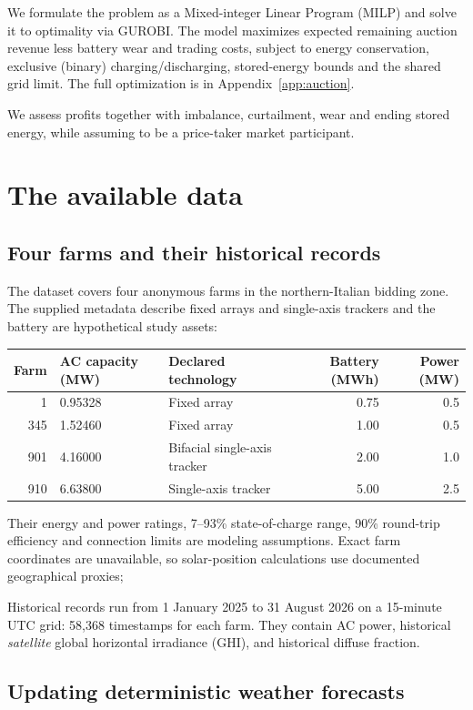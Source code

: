 \documentclass[11pt,a4paper]{article}
\begin{document}
We formulate the problem as a Mixed-integer Linear Program (MILP) and solve it 
to optimality via GUROBI. The model maximizes expected
 remaining auction revenue less battery wear and
trading costs, subject to energy conservation, exclusive (binary) charging/discharging,
stored-energy bounds and the shared grid limit. The full optimization is in
Appendix~\ref{app:auction}.

We assess profits together with imbalance, curtailment, wear and
ending stored energy, while assuming to be a price-taker market participant.

\section{The available data}
\subsection{Four farms and their historical records}
The dataset covers four anonymous farms in the northern-Italian bidding zone.
 The supplied metadata describe
fixed arrays and single-axis trackers and the battery are hypothetical study assets:
\begin{center}\small
\begin{tabular}{rllrr}
\toprule Farm & AC capacity (MW) & Declared technology & Battery (MWh) & Power (MW)\\\midrule
1   & 0.95328 & Fixed array & 0.75 & 0.5\\
345 & 1.52460 & Fixed array & 1.00 & 0.5\\
901 & 4.16000 & Bifacial single-axis tracker & 2.00 & 1.0\\
910 & 6.63800 & Single-axis tracker & 5.00 & 2.5\\
\bottomrule\end{tabular}\end{center}
 Their energy and power ratings,
7--93\% state-of-charge range, 90\% round-trip efficiency and connection limits
are modeling assumptions. Exact farm coordinates are unavailable, so solar-position
calculations use documented geographical proxies;

Historical records run from 1 January 2025 to 31 August 2026 on a 15-minute
UTC grid: 58,368 timestamps for each farm. They contain AC power, historical
\emph{satellite} global horizontal irradiance (GHI), and historical diffuse fraction.


\subsection{Updating deterministic weather forecasts}
\end{document}
